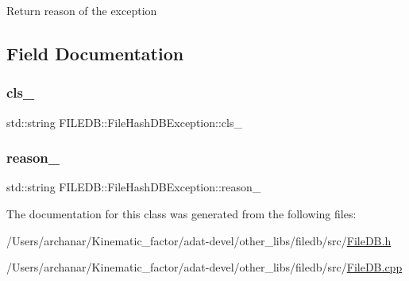 Return reason of the exception 

\subsection{Field Documentation}
\mbox{\label{classFILEDB_1_1FileHashDBException_a758ffa21cceee63da7f40d93c6e0c2b3}} 
\subsubsection{\texorpdfstring{cls\_}{cls\_}}
{\footnotesize\ttfamily std\+::string F\+I\+L\+E\+D\+B\+::\+File\+Hash\+D\+B\+Exception\+::cls\+\_\+\hspace{0.3cm}{\ttfamily [protected]}}

\mbox{\label{classFILEDB_1_1FileHashDBException_a03d9f75945799fec0e00195daed5aaad}} 
\subsubsection{\texorpdfstring{reason\_}{reason\_}}
{\footnotesize\ttfamily std\+::string F\+I\+L\+E\+D\+B\+::\+File\+Hash\+D\+B\+Exception\+::reason\+\_\+\hspace{0.3cm}{\ttfamily [protected]}}



The documentation for this class was generated from the following files\+:\begin{DoxyCompactItemize}
\item 
/\+Users/archanar/\+Kinematic\+\_\+factor/adat-\/devel/other\+\_\+libs/filedb/src/\mbox{\hyperlink{adat-devel_2other__libs_2filedb_2src_2FileDB_8h}{File\+D\+B.\+h}}\item 
/\+Users/archanar/\+Kinematic\+\_\+factor/adat-\/devel/other\+\_\+libs/filedb/src/\mbox{\hyperlink{adat-devel_2other__libs_2filedb_2src_2FileDB_8cpp}{File\+D\+B.\+cpp}}\end{DoxyCompactItemize}
